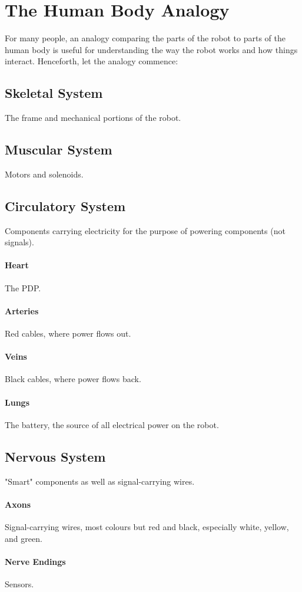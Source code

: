 \documentclass[]{report}
\begin{document}
\section{The Human Body Analogy}
	For many people, an analogy comparing the parts of the robot to parts of the human body is useful for understanding the way the robot works and how things interact.
	Henceforth, let the analogy commence:
\subsection*{Skeletal System}
The frame and mechanical portions of the robot.
\subsection*{Muscular System}
Motors and solenoids.
\subsection*{Circulatory System}
Components carrying electricity for the purpose of powering components (not signals).
\paragraph{Heart}
The PDP.
\paragraph{Arteries}
Red cables, where power flows out.
\paragraph{Veins}
Black cables, where power flows back.
\paragraph{Lungs}
The battery, the source of all electrical power on the robot.
\subsection*{Nervous System}
"Smart" components as well as signal-carrying wires.
\paragraph{Axons}
Signal-carrying wires, most colours but red and black, especially white, yellow, and green.
\paragraph{Nerve Endings}
Sensors.
\end{document}
